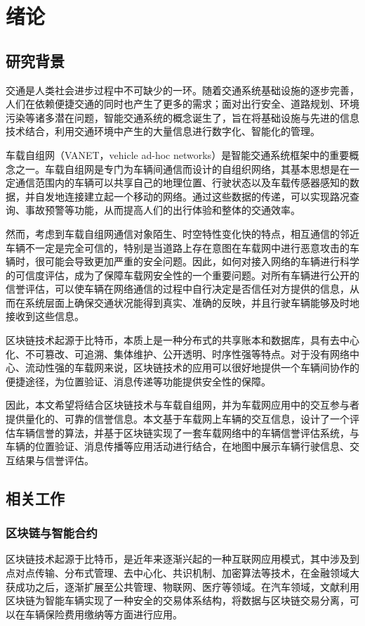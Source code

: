 
\chapter{绪论}

\section{研究背景}

交通是人类社会进步过程中不可缺少的一环。随着交通系统基础设施的逐步完善，人们在依赖便捷交通的同时也产生了更多的需求；面对出行安全、道路规划、环境污染等诸多潜在问题，智能交通系统的概念诞生了，旨在将基础设施与先进的信息技术结合，利用交通环境中产生的大量信息进行数字化、智能化的管理。

车载自组网（VANET，vehicle ad-hoc networks）是智能交通系统框架中的重要概念之一。车载自组网是专门为车辆间通信而设计的自组织网络，其基本思想是在一定通信范围内的车辆可以共享自己的地理位置、行驶状态以及车载传感器感知的数据，并自发地连接建立起一个移动的网络。通过这些数据的传递，可以实现路况查询、事故预警等功能，从而提高人们的出行体验和整体的交通效率。

然而，考虑到车载自组网通信对象陌生、时空特性变化快的特点，相互通信的邻近车辆不一定是完全可信的，特别是当道路上存在意图在车载网中进行恶意攻击的车辆时，很可能会导致更加严重的安全问题。因此，如何对接入网络的车辆进行科学的可信度评估，成为了保障车载网安全性的一个重要问题。对所有车辆进行公开的信誉评估，可以使车辆在网络通信的过程中自行决定是否信任对方提供的信息，从而在系统层面上确保交通状况能得到真实、准确的反映，并且行驶车辆能够及时地接收到这些信息。

区块链技术起源于比特币，本质上是一种分布式的共享账本和数据库，具有去中心化、不可篡改、可追溯、集体维护、公开透明、时序性强等特点。对于没有网络中心、流动性强的车载网来说，区块链技术的应用可以很好地提供一个车辆间协作的便捷途径，为位置验证、消息传递等功能提供安全性的保障。

因此，本文希望将结合区块链技术与车载自组网，并为车载网应用中的交互参与者提供量化的、可靠的信誉信息。本文基于车载网上车辆的交互信息，设计了一个评估车辆信誉的算法，并基于区块链实现了一套车载网络中的车辆信誉评估系统，与车辆的位置验证、消息传播等应用活动进行结合，在地图中展示车辆行驶信息、交互结果与信誉评估。

\section{相关工作}

\subsection{区块链与智能合约}
区块链技术起源于比特币，是近年来逐渐兴起的一种互联网应用模式，其中涉及到点对点传输、分布式管理、去中心化、共识机制、加密算法等技术，在金融领域大获成功之后，逐渐扩展至公共管理、物联网、医疗等领域。在汽车领域，文献\cite{blockchain0}利用区块链为智能车辆实现了一种安全的交易体系结构，将数据与区块链交易分离，可以在车辆保险费用缴纳等方面进行应用。

